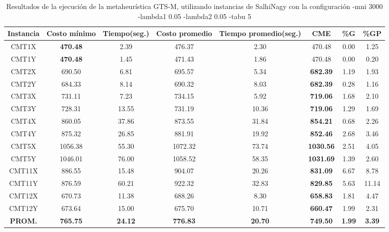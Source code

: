 \begin{table}[h]
\caption{Resultados de la ejecución de la metaheurística GTS-M, utilizando instancias de SalhiNagy con la configuración -mni 3000 -lambda1 0.05 -lambda2 0.05 -tabu 5}
\centering
\small
\begin{tabular}{c c c c c c c c}
\hline\hline
Instancia & Costo mínimo & Tiempo(seg.) & Costo promedio & Tiempo promedio(seg.) & CME & \%G & \%GP \\ [0.5ex]
\hline
CMT1X & \bf{470.48} & 2.39 & 
476.37 & 2.30 & 470.48 & 0.00
 & 1.25\\CMT1Y & \bf{470.48} & 1.45 & 
471.43 & 1.86 & 470.48 & 0.00
 & 0.20\\CMT2X & 690.50 & 6.81 & 
695.57 & 5.34 & \bf{682.39} & 
1.19 & 1.93\\CMT2Y & 684.33 & 8.14 & 
690.32 & 8.03 & \bf{682.39} & 
0.28 & 1.16\\CMT3X & 731.11 & 7.23 & 
734.15 & 5.92 & \bf{719.06} & 
1.68 & 2.10\\CMT3Y & 728.31 & 13.55 & 
731.19 & 10.36 & \bf{719.06} & 
1.29 & 1.69\\CMT4X & 860.05 & 37.86 & 
873.55 & 31.84 & \bf{854.21} & 
0.68 & 2.26\\CMT4Y & 875.32 & 26.85 & 
881.91 & 19.92 & \bf{852.46} & 
2.68 & 3.46\\CMT5X & 1056.38 & 55.30 & 
1072.32 & 73.74 & \bf{1030.56} & 
2.51 & 4.05\\CMT5Y & 1046.01 & 76.00 & 
1058.52 & 58.35 & \bf{1031.69} & 
1.39 & 2.60\\CMT11X & 886.55 & 15.48 & 
904.07 & 20.26 & \bf{831.09} & 
6.67 & 8.78\\CMT11Y & 876.59 & 60.21 & 
922.32 & 32.83 & \bf{829.85} & 
5.63 & 11.14\\CMT12X & 670.73 & 11.38 & 
688.26 & 8.30 & \bf{658.83} & 
1.81 & 4.47\\CMT12Y & 673.64 & 15.00 & 
675.70 & 10.71 & \bf{660.47} & 
1.99 & 2.31\\\bf{PROM.} & 
\bf{765.75} & \bf{24.12} & \bf{776.83} & \bf{20.70} & \bf{749.50} & \bf{1.99} & \bf{3.39}\\[1ex]\hline
\end{tabular}
\label{table:nonlin}
\end{table}
